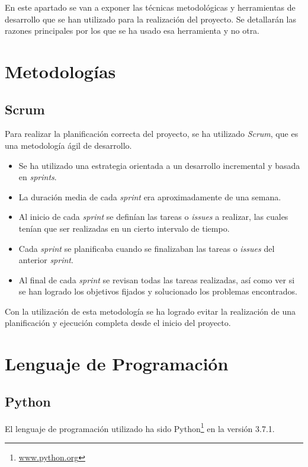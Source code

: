 
En este apartado se van a exponer las técnicas metodológicas y herramientas de desarrollo que se han utilizado para la realización del proyecto. Se detallarán las razones principales por los que se ha usado esa herramienta y no otra.

\section{Metodologías}\label{metodologias}

\subsection{Scrum}\label{scrum}
Para realizar la planificación correcta del proyecto, se ha utilizado \emph{Scrum}, que es una metodología ágil de desarrollo.

\begin{itemize}
	\item Se ha utilizado una estrategia orientada a un desarrollo incremental y basada en \emph{sprints}.
	\item La duración media de cada \emph{sprint} era aproximadamente de una semana.
	\item Al inicio de cada \emph{sprint} se definían las tareas o \emph{issues} a realizar, las cuales tenían que ser realizadas en un cierto intervalo de tiempo.
	\item Cada \emph{sprint} se planificaba cuando se finalizaban las tareas o \emph{issues} del anterior \emph{sprint}.	
	\item Al final de cada \emph{sprint} se revisan todas las tareas realizadas, así como ver si se han logrado los objetivos fijados y solucionado los problemas encontrados.
\end{itemize}

Con la utilización de esta metodología se ha logrado evitar la realización de una planificación y ejecución completa desde el inicio del proyecto.


\section{Lenguaje de Programación}\label{lenguaje_de_programacion}
\subsection{Python}\label{python}
El lenguaje de programación utilizado ha sido Python\footnote{\href {http://www.python.org/}{www.python.org}} en la versión 3.7.1.

